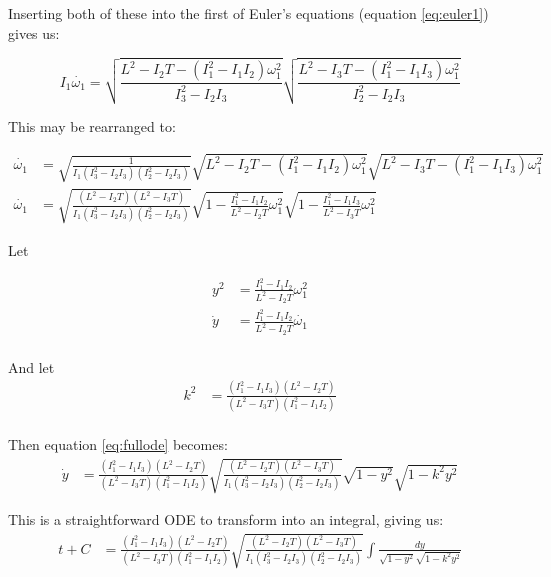 \documentclass[a4paper, 12pt]{article}
\begin{document}
Inserting both of these into the first of Euler's equations (equation \ref{eq:euler1}) gives us:

\begin{equation}
  I_1\dot{\omega_1} = \sqrt{\frac{L^2 - I_2T - (I_1^2 - I_1I_2)\omega_1^2}{I_3^2 - I_2I_3}}\sqrt{\frac{L^2 - I_3T - (I_1^2 - I_1I_3)\omega_1^2}{I_2^2 - I_2I_3}}
\end{equation}

This may be rearranged to:

  \begin{align}
    \dot{\omega_1} &= \sqrt{\frac{1}{I_1(I_3^2 - I_2I_3)(I_2^2 - I_2I_3)}}\sqrt{L^2 - I_2T - (I_1^2 - I_1I_2)\omega_1^2}\sqrt{L^2 - I_3T - (I_1^2 - I_1I_3)\omega_1^2} \\
    \dot{\omega_1} &= \sqrt{\frac{(L^2 - I_2T)(L^2 - I_3T)}{I_1(I_3^2 - I_2I_3)(I_2^2 - I_2I_3)}}\sqrt{ 1 - \frac{I_1^2 - I_1I_2}{L^2 - I_2T}\omega_1^2}\sqrt{ 1 - \frac{I_1^2 - I_1I_3}{L^2 - I_3T}\omega_1^2}\label{eq:fullode}
  \end{align}

Let

\begin{align}
  y^2 &= \frac{I_1^2 - I_1I_2}{L^2 - I_2T}\omega_1^2 \\
  \dot{y} &= \frac{I_1^2 - I_1I_2}{L^2 - I_2T}\dot{\omega_1} \\
\end{align}

And let
\begin{align}
  k^2 & = \frac{(I_1^2 - I_1I_3)(L^2 - I_2T)}{(L^2 - I_3T)(I_1^2 - I_1I_2)} \\  
\end{align}

Then equation \ref{eq:fullode} becomes:
\begin{align}
  \dot{y}&=\frac{(I_1^2 - I_1I_3)(L^2 - I_2T)}{(L^2 - I_3T)(I_1^2 - I_1I_2)}\sqrt{\frac{(L^2 - I_2T)(L^2 - I_3T)}{I_1(I_3^2 - I_2I_3)(I_2^2 - I_2I_3)}}\sqrt{ 1 - y^2}\sqrt{ 1 - k^2y^2}
\end{align}

This is a straightforward ODE to transform into an integral, giving us:
\begin{align}
  t + C &=\frac{(I_1^2 - I_1I_3)(L^2 - I_2T)}{(L^2 - I_3T)(I_1^2 - I_1I_2)}\sqrt{\frac{(L^2 - I_2T)(L^2 - I_3T)}{I_1(I_3^2 - I_2I_3)(I_2^2 - I_2I_3)}}\int\frac{dy}{\sqrt{ 1 - y^2}\sqrt{ 1 - k^2y^2}}
\end{align}
\end{document}
